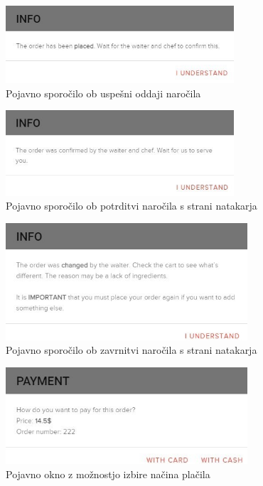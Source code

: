 \documentclass[a4paper, 12pt]{book}
\begin{document}
\begin{figure}[!htb]
\begin{center}
\includegraphics[width=8.5cm]{gost_5.jpg}
\caption{Pojavno sporočilo ob uspešni oddaji naročila}
\label{Gost_5}
\end{center}
\end{figure}
\begin{figure}[!htb]
\begin{center}
\includegraphics[width=8.5cm]{gost_6.jpg}
\caption{Pojavno sporočilo ob potrditvi naročila s strani natakarja}
\label{Gost_6}
\end{center}
\end{figure}
\begin{figure}[!htb]
\begin{center}
\includegraphics[width=9cm]{gost_8.jpg}
\caption{Pojavno sporočilo ob zavrnitvi naročila s strani natakarja}
\label{Gost_8}
\end{center}
\end{figure}
\begin{figure}[!htb]
\begin{center}
\includegraphics[width=9cm]{gost_7.jpg}
\caption{Pojavno okno z možnostjo izbire načina plačila}
\label{Gost_7}
\end{center}
\end{figure}
\end{document}
